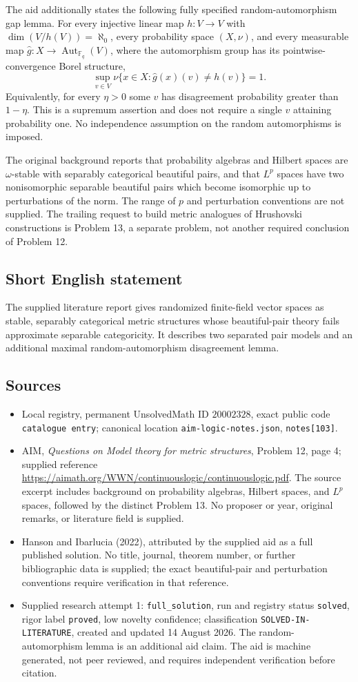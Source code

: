 \documentclass[11pt]{article}
\newcommand{\F}{\mathbb{F}}
\begin{document}
The aid additionally states the following fully specified random-automorphism gap lemma. For every injective linear map \(h:V\to V\) with \(\dim(V/h(V))=\aleph_0\), every probability space \((X,\nu)\), and every measurable map \(\widehat g:X\to\operatorname{Aut}_{\F_q}(V)\), where the automorphism group has its pointwise-convergence Borel structure,
\[
 \sup_{v\in V}\nu\{x\in X:\widehat g(x)(v)\ne h(v)\}=1.
\]
Equivalently, for every \(\eta>0\) some \(v\) has disagreement probability greater than \(1-\eta\). This is a supremum assertion and does not require a single \(v\) attaining probability one. No independence assumption on the random automorphisms is imposed.

The original background reports that probability algebras and Hilbert spaces are \(\omega\)-stable with separably categorical beautiful pairs, and that \(L^p\) spaces have two nonisomorphic separable beautiful pairs which become isomorphic up to perturbations of the norm. The range of \(p\) and perturbation conventions are not supplied. The trailing request to build metric analogues of Hrushovski constructions is Problem 13, a separate problem, not another required conclusion of Problem 12.
\subsection{Short English statement}
The supplied literature report gives randomized finite-field vector spaces as stable, separably categorical metric structures whose beautiful-pair theory fails approximate separable categoricity. It describes two separated pair models and an additional maximal random-automorphism disagreement lemma.
\subsection{Sources}
\begin{itemize}
\item Local registry, permanent UnsolvedMath ID \(20002328\), exact public code \texttt{catalogue entry}; canonical location \texttt{aim-logic-notes.json}, \texttt{notes[103]}.
\item AIM, \emph{Questions on Model theory for metric structures}, Problem 12, page 4; supplied reference \url{https://aimath.org/WWN/continuouslogic/continuouslogic.pdf}. The source excerpt includes background on probability algebras, Hilbert spaces, and \(L^p\) spaces, followed by the distinct Problem 13. No proposer or year, original remarks, or literature field is supplied.
\item Hanson and Ibarlucia (2022), attributed by the supplied aid as a full published solution. No title, journal, theorem number, or further bibliographic data is supplied; the exact beautiful-pair and perturbation conventions require verification in that reference.
\item Supplied research attempt 1: \texttt{full\_solution}, run and registry status \texttt{solved}, rigor label \texttt{proved}, low novelty confidence; classification \texttt{SOLVED-IN-LITERATURE}, created and updated 14 August 2026. The random-automorphism lemma is an additional aid claim. The aid is machine generated, not peer reviewed, and requires independent verification before citation.
\end{itemize}
\end{document}
